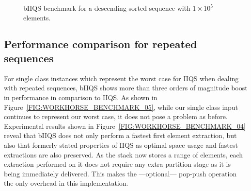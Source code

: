 \begin{figure}
    \caption{bIIQS benchmark for a descending sorted sequence with $1\times10^5$ elements.}
       \label{FIG:WORKHORSE_BENCHMARK_03}
\end{figure}


\subsection{Performance comparison for repeated sequences}

For single class instances which represent the worst case for IIQS when dealing with repeated sequences, bIIQS shows more than three orders of magnitude boost in performance in comparison to IIQS. As shown in Figure~\ref{FIG:WORKHORSE_BENCHMARK_05}, while our single class input continues to represent our worst case, it does not pose a problem as before. \\

Experimental results shown in Figure~\ref{FIG:WORKHORSE_BENCHMARK_04} reveal that bIIQS does not only perform a fastest first element extraction, but also that formerly stated properties of IIQS as optimal space usage and fastest extractions are also preserved. As the stack now stores a range of elements, each extraction performed on it does not require any extra partition stage as it is being immediately delivered. This makes the ---optional--- pop-push operation the only overhead in this implementation.\\

